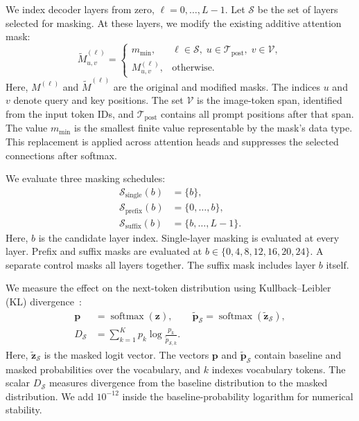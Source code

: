 \documentclass{article} %
\begin{document}
We index decoder layers from zero, \(\ell=0,\ldots,L-1\). Let \(\mathcal{S}\) be the set of layers selected for
masking. At these layers, we modify the existing additive attention mask:
\begin{equation}
    \widetilde{M}^{(\ell)}_{u,v} =
    \begin{cases}
        m_{\min}, & \ell\in\mathcal{S},\;
        u\in\mathcal{T}_{\mathrm{post}},\;v\in\mathcal{V}, \\
        M^{(\ell)}_{u,v}, & \text{otherwise}.
    \end{cases}
\end{equation}
Here, \(M^{(\ell)}\) and \(\widetilde{M}^{(\ell)}\) are the original
and modified masks. The indices \(u\) and \(v\) denote query and key
positions. The set \(\mathcal{V}\) is the image-token span, identified
from the input token IDs, and \(\mathcal{T}_{\mathrm{post}}\) contains
all prompt positions after that span. The value \(m_{\min}\) is the
smallest finite value representable by the mask's data type. This
replacement is applied across attention heads and suppresses the
selected connections after softmax.

We evaluate three masking schedules:
\begin{align}
    \mathcal{S}_{\mathrm{single}}(b) &= \{b\}, \\
    \mathcal{S}_{\mathrm{prefix}}(b) &= \{0,\ldots,b\}, \\
    \mathcal{S}_{\mathrm{suffix}}(b) &= \{b,\ldots,L-1\}.
\end{align}
Here, \(b\) is the candidate layer index. Single-layer masking is
evaluated at every layer. Prefix and suffix masks are evaluated at
\(b\in\{0,4,8,12,16,20,24\}\). A separate control masks all layers
together. The suffix mask includes layer \(b\) itself.

We measure the effect on the next-token distribution using
Kullback--Leibler (KL) divergence~\citep{kullback1951information}:
\begin{align}
    \mathbf{p} &= \operatorname{softmax}(\mathbf{z}), \qquad
    \widetilde{\mathbf{p}}_{\mathcal{S}} =
    \operatorname{softmax}(\widetilde{\mathbf{z}}_{\mathcal{S}}), \\
    D_{\mathcal{S}} &= \sum_{k=1}^{K}
    p_k\log\frac{p_k}{\widetilde{p}_{\mathcal{S},k}}.
\end{align}
Here, \(\widetilde{\mathbf{z}}_{\mathcal{S}}\) is the masked logit
vector. The vectors \(\mathbf{p}\) and
\(\widetilde{\mathbf{p}}_{\mathcal{S}}\) contain baseline and masked
probabilities over the vocabulary, and \(k\) indexes vocabulary tokens.
The scalar \(D_{\mathcal{S}}\) measures divergence from the baseline
distribution to the masked distribution. We add \(10^{-12}\) inside
the baseline-probability logarithm for numerical stability.
\end{document}
